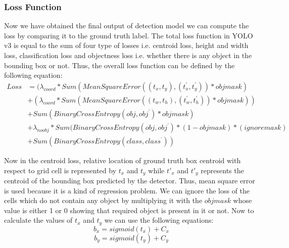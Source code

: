 \subsubsection{Loss Function}
Now we have obtained the final output of detection model we can compute the loss by comparing it to the ground truth label. The total loss function in YOLO v3 is equal to the sum of four type of losses i.e. centroid loss, height and width loss, classification loss and objectness loss i.e. whether there is any object in the bounding box or not. Thus, the overall loss function can be defined by the following equation:
\begin{equation}
\begin{split}
    Loss &= (\lambda_{coord} * Sum(Mean Square Error((t_x,t_y),                 (t_x^{'},t_y^{'}))*obj mask) \\
   &+(\lambda_{coord} * Sum(Mean Square Error((t_w,t_h), (t_w^{'},t_h^{'}))*obj mask) ) \\
   &+ Sum(Binary Cross Entropy(obj, obj^{’}) * obj mask)\\
   &+ \lambda_{noobj} * Sum(Binary Cross Entropy(obj, obj^{’}) * (1 -obj mask)*(ignore mask) \\
   &+ Sum(Binary Cross Entropy(class, class^{’}))
\end{split}
\end{equation}

Now in the centroid loss, relative location of ground truth box centroid with respect to grid cell is represented by $t_{x}$ and $t_{y}$ while $t'_{x}$ and $t'_{y}$ represents the centroid of the bounding box predicted by the detector. Thus, mean square error is used because it is a kind of regression problem. We can ignore the loss of the cells which do not contain any object by multiplying it with the $objmask$ whose value is either 1 or 0 showing that required object is present in it or not. Now to calculate the values of $t_{x}$ and $t_{y}$ we can use the following equations:
\begin{equation}
    b_x = sigmoid(t_x) + C_x
\end{equation}
\begin{equation}
    b_y = sigmoid(t_y) + C_y
\end{equation}

